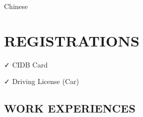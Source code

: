 \documentclass[11pt,A4,english]{article}
\begin{document}
\begin{paracol}{2}
\begin{leftcolumn}
\begin{addmargin}[2em]{1em}
\begin{addmargin}[-3em]{.5em}
                    \vspace{-12pt}
                    
                    \hspace{15pt}Chinese

                \end{addmargin}
        
        \end{addmargin}
        
    \vspace{1em}
    
    \section{REGISTRATIONS}

        \begin{addmargin}[2em]{0em}
                \begin{addmargin}[-3em]{1em}
                    
                    \vspace{0pt}

                    \hspace{15pt} \faCheck \hspace{.5pt} CIDB Card\\
                    
                    \vspace{-12pt}
                    
                    \hspace{-2pt} \faCheck \hspace{1pt} Driving License (Car)
                    
                \end{addmargin}
        
        \end{addmargin}
    
\end{leftcolumn}


\begin{rightcolumn}

    \section{WORK EXPERIENCES} 
     
        \begin{addmargin}[0em]{0em}
        

\end{addmargin}
\end{rightcolumn}
\end{paracol}
\end{document}
